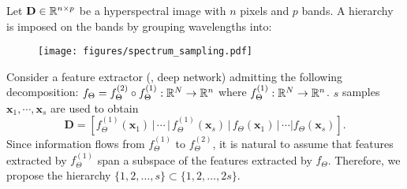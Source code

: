 \begin{exmp}\label{ex:spectrum_hierarchy}
    Let $\mathbf{D} \in \mathbb{R}^{n \times p}$ be a hyperspectral image with $n$ pixels and $p$ bands. A hierarchy is imposed on the bands by grouping wavelengths into: 
    \begin{figure}[H]
        \vspace{-4mm}
        \centering
        \texttt{[image: figures/spectrum\_sampling.pdf]}
        \vspace{-8mm}
    \end{figure}
\end{exmp}

\begin{exmp}\label{ex:feature_hierarchy}
    Consider a feature extractor (\eg, deep network) admitting the following decomposition: $f_\Theta = f^{(2)}_\Theta \circ f^{(1)}_\Theta: \mathbb{R}^N \rightarrow \mathbb{R}^{n}$ where $f^{(1)}_\Theta:\mathbb{R}^{N} \rightarrow \mathbb{R}^{n}$. $s$ samples $\bm{x}_1,\cdots,\bm{x}_s$ are used to obtain 
    \begin{equation*}
         \mathbf{D} = \left[ f^{(1)}_\Theta(\bm{x}_1)\,|\, \cdots\,|\, f^{(1)}_\Theta(\bm{x}_s)\,|\,f_\Theta(\bm{x}_1)\,|\, \cdots| f_\Theta(\bm{x}_s) \right] .
    \end{equation*}
    Since information flows from $f^{(1)}_\Theta$ to  $f^{(2)}_\Theta$, it is natural to assume that features extracted by $f^{(1)}_\Theta$ span a subspace of the features extracted by $f_{\Theta}$. Therefore, we propose the hierarchy $\{ 1,2,\dots, s\} \subset \{ 1,2,\dots,2s\}$.
\end{exmp}
    \begin{comment}
    \begin{equation*}
         \mathbf{D} = \left[ f_\Theta(\bm{x}_1)\,|\, \cdots\,|\, f_\Theta(\bm{x}_s)\,|\,f^{(2)}_\Theta(\bm{x}_1)\,|\, \cdots| f^{(2)}_\Theta(\bm{x}_s) \right] .
    \end{equation*}
    The most discriminatory representations are likely closer to the classification head of the feature extractor (e.g., $f_{\Theta}$). Therefore we propose the hierarchy $\{ 1,2,\dots, s\} \subset \{ 1,2,\dots,2s\}$ because, with this, the features extracted by $f_{\Theta}$ appear in both sets of the hierarchy. 
    \end{comment}



